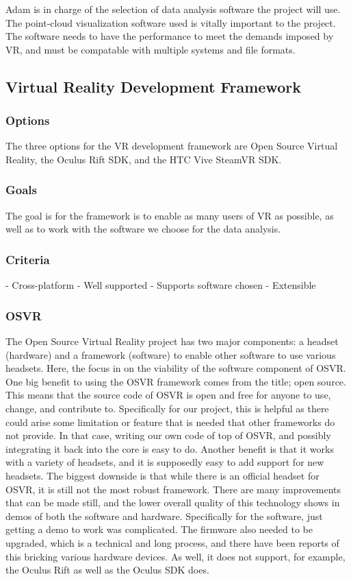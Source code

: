 Adam is in charge of the selection of data analysis software the project will use.
The point-cloud visualization software used is vitally important to the project.
The software needs to have the performance to meet the demands imposed by VR, and must be compatable with multiple systems and file formats.

\subsection{Virtual Reality Development Framework}

\subsubsection{Options}
The three options for the VR development framework are Open Source Virtual Reality, the Oculus Rift SDK,
and the HTC Vive SteamVR SDK.

\subsubsection{Goals}
The goal is for the framework is to enable as many users of VR as possible, as well as to work with
the software we choose for the data analysis. 

\subsubsection{Criteria}
- Cross-platform
- Well supported
- Supports software chosen
- Extensible

\subsubsection{OSVR}
The Open Source Virtual Reality project has two major components: a headset (hardware) and a framework (software) to enable
other software to use various headsets. Here, the focus in on the viability of the software component of OSVR. 
One big benefit to using the OSVR framework comes from the title; open source. This means that the source code
of OSVR is open and free for anyone to use, change, and contribute to. Specifically for our project, this is helpful
as there could arise some limitation or feature that is needed that other frameworks do not provide. In that case,
writing our own code of top of OSVR, and possibly integrating it back into the core is easy to do. Another benefit
is that it works with a variety of headsets, and it is supposedly easy to add support for new headsets.
The biggest downside is that while there is an official headset for OSVR, it is still not the most robust framework.
There are many improvements that can be made still, and the lower overall quality of this technology shows in demos
of both the software and hardware. Specifically for the software, just getting a demo to work was complicated. The firmware
also needed to be upgraded, which is a technical and long process, and there have been reports of this bricking various
hardware devices. As well, it does not support, for example, the Oculus Rift as well as the Oculus SDK does.

